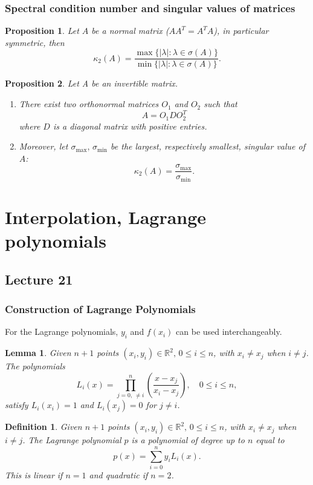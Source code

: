 \documentclass{article}
\newtheorem{lemma}{Lemma}
\newtheorem{definition}{Definition}
\newtheorem{proposition}{Proposition}
\begin{document}
\subsubsection{Spectral condition number and singular values of matrices}
\begin{proposition}
    Let $A$ be a normal matrix ($AA^T = A^TA$), in particular symmetric, then
    \begin{equation}
        \kappa_2(A) = \frac{\max\{\vert\lambda\vert:\lambda\in\sigma(A)\}}{\min\{\vert\lambda\vert:\lambda\in\sigma(A)\}}.\nonumber
    \end{equation}
\end{proposition}
\begin{proposition}
    Let A be an invertible matrix.
    \begin{enumerate}
        \item There exist two orthonormal matrices $O_1$ and $O_2$ such that
        \begin{equation}
            A=O_1 DO_2^T
        \end{equation}
        where $D$ is a diagonal matrix with positive entries.
        \item Moreover, let $\sigma_{\max},\,\sigma_{\min}$ be the largest, respectively smallest, singular value of $A$:
        \begin{equation}
            \kappa_2(A)=\frac{\sigma_{\max}}{\sigma_{\min}}.\nonumber
        \end{equation}
    \end{enumerate}
\end{proposition}
\section{Interpolation, Lagrange polynomials}
\subsection{Lecture 21}
\subsubsection{Construction of Lagrange Polynomials}
For the Lagrange polynomials, $y_i$ and $f(x_i)$ can be used interchangeably.
\begin{lemma}
    Given $n+1$ points $(x_i,y_i) \in \mathbb{R}^2,\,0\leq i\leq n$, with $x_i\neq x_j$ when $i\neq j$. The polynomials
\begin{equation}
    L_i(x) = \prod_{j=0,\,\neq i}^n \left(\frac{x-x_j}{x_i-x_j}\right),\quad 0\leq i \leq n,
\end{equation}
satisfy $L_i(x_i)=1$ and $L_i(x_j)=0$ for $j\neq i$.
\end{lemma}
\begin{definition}
    Given $n+1$ points $(x_i,y_i) \in \mathbb{R}^2,\,0\leq i\leq n$, with $x_i\neq x_j$ when $i\neq j$. The Lagrange polynomial $p$ is a polynomial of degree up to $n$ equal to
\begin{equation}
    p(x) = \sum_{i=0}^n y_iL_i(x).
\end{equation}
This is \textit{linear} if $n=1$ and \textit{quadratic} if $n=2$.
\end{definition}
\end{document}
